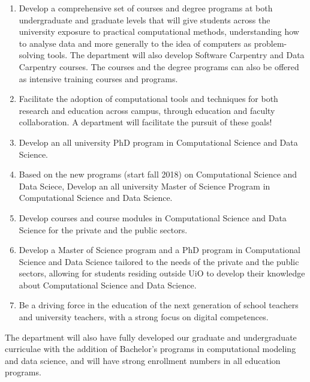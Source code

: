 \documentclass[oneside,final,10pt]{article}
\begin{document}
\begin{enumerate}
\item Develop a comprehensive set of courses and degree programs at both undergraduate and graduate levels that will give students across the university exposure to practical computational methods, understanding how to analyse data and more generally to the idea of computers as problem-solving tools. The department will also  develop  Software Carpentry and Data Carpentry courses. The courses and the degree programs can also be offered as intensive training courses and programs.	

\item Facilitate the adoption of computational tools and techniques for both research and education across campus, through education and faculty collaboration. A  department will facilitate the pursuit of these goals!	

\item Develop an all university PhD program in Computational Science and Data Science.

\item Based on the new programs (start fall 2018) on Computational Science and Data Sciece, Develop an all university Master of Science Program in Computational Science and Data Science.

\item Develop courses and course modules in Computational Science and Data Science for the private and the public sectors.

\item Develop a Master of Science program and a PhD program in Computational Science and Data Science tailored to the needs of the private and the public sectors, allowing for students residing outside UiO to develop their knowledge about Computational Science and Data Science.

\item Be a driving force in the education of  the next generation of school teachers and university teachers,  with a strong focus on digital competences. 
\end{enumerate}

The department will also have fully developed  our graduate and undergraduate curriculae
with the addition of Bachelor’s programs in computational modeling and
data science, and will have strong enrollment numbers in all education programs. 
\end{document}
